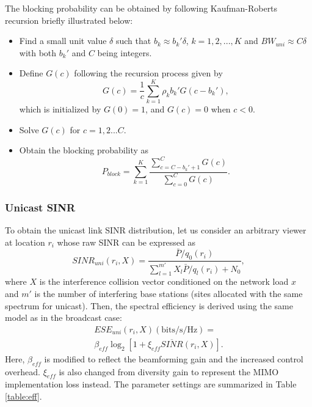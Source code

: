 \documentclass[journal]{IEEEtran}
\begin{document}
The blocking probability can be obtained by following Kaufman-Roberts recursion \cite{Roberts} briefly illustrated below:
\begin{itemize}
  \item Find a small unit value $\delta$ such that $b_k\approx b_k'\delta$, $k=1,2,...,K$ and $BW_{uni}\approx C\delta$ with both $b_k'$ and $C$ being integers.
  \item Define $G(c)$ following the recursion process given by
      \begin{equation}\label{G}
     G(c)=\frac{1}{c}\sum_{k=1}^K\rho_kb_k'G(c-b_k'),
\end{equation}
which is initialized by $G(0)=1$, and $G(c)=0$ when $c<0$.
  \item Solve $G(c)$ for $c=1,2...C$.
  \item Obtain the blocking probability as
  \begin{equation}\label{eqn:Block3}
    P_{block}=\sum_{k=1}^K\frac{\sum_{c=C-b_k'+1}^CG(c)}{\sum_{c=0}^CG(c)}.
  \end{equation}
\end{itemize}


\subsubsection{\textbf{Unicast SINR}}
To obtain the unicast link SINR distribution, let us consider an arbitrary viewer at location $r_i$ whose raw SINR can be expressed as
\begin{equation}\label{SINR_uni}
  	SINR_{uni}(r_i,X)=\frac{\bar{P}/q_0 (r_i)}{\sum_{l=1}^{m'}X_l\bar{P}/q_l (r_i)+N_0},
\end{equation}
where $X$ is the interference collision vector conditioned on the network load $x$ and $m'$ is the number of interfering base stations (sites allocated with the same spectrum for unicast). Then, the spectral efficiency is derived using the same model as in the broadcast case:
\begin{equation}\label{ESE_uni}
\begin{aligned}
  	ESE_{uni}(r_i,X)(\mathrm{bits/s/Hz})=\\
  \beta_{eff}\log_2⁡[1+\xi_{eff} \overline{SINR}(r_i,X)].
    \end{aligned}
\end{equation}
Here, $\beta_{eff}$ is modified to reflect the beamforming gain and the increased control overhead. $\xi_{eff}$ is also changed from diversity gain to represent the MIMO implementation loss instead. The parameter settings are summarized in Table \ref{table:eff}.
\end{document}
